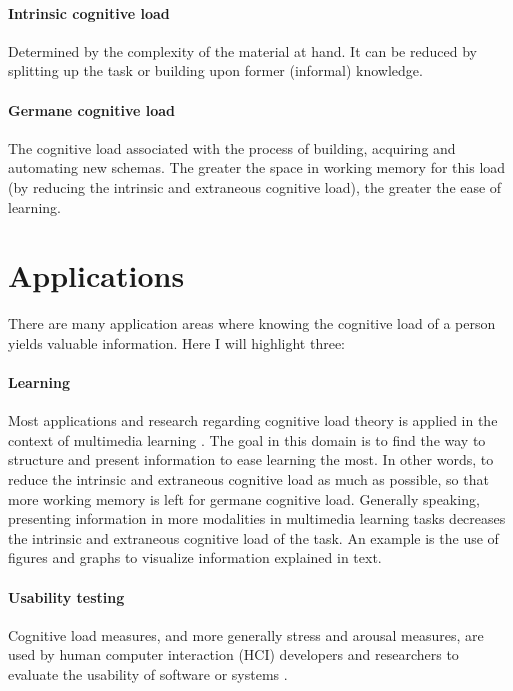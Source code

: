 \documentclass[11pt,leqno,a4paper]{report} %
\begin{document}
\paragraph{Intrinsic cognitive load}
Determined by the complexity of the material at hand. It can be reduced by splitting up the task or building upon former (informal) knowledge.

\paragraph{Germane cognitive load}
The cognitive load associated with the process of building, acquiring and automating new schemas. The greater the space in working memory for this load (by reducing the intrinsic and extraneous cognitive load), the greater the ease of learning.

\section{Applications}
There are many application areas where knowing the cognitive load of a person yields valuable information. Here I will highlight three:

\paragraph{Learning}
Most applications and research regarding cognitive load theory is applied in the context of multimedia learning \citep{brunken2003direct}. The goal in this domain is to find the way to structure and present information to ease learning the most. In other words, to reduce the intrinsic and extraneous cognitive load as much as possible, so that more working memory is left for germane cognitive load. Generally speaking, presenting information in more modalities in multimedia learning tasks decreases the intrinsic and extraneous cognitive load of the task. An example is the use of figures and graphs to visualize information explained in text.

\pagebreak

\paragraph{Usability testing}
Cognitive load measures, and more generally stress and arousal measures, are used by human computer interaction (HCI) developers and researchers to evaluate the usability of software or systems \citep{Jacob2003} \citep{Schmutz2009}.
\end{document}
